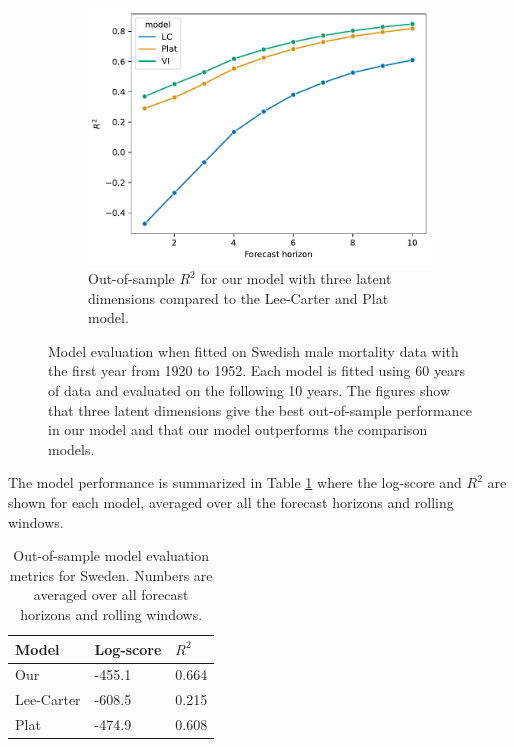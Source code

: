 \documentclass[preprint,12pt]{elsarticle}
\begin{document}
\begin{figure}
\begin{subfigure}[b]{0.45\textwidth}
        \label{fig:model_evaluation_sweden_R2}
    \end{subfigure}
    \hfill
    \begin{subfigure}[b]{0.45\textwidth}
        \centering
        \includegraphics[width=\textwidth]{figs/model_comparison.pdf}
        \caption{Out-of-sample $R^2$ for our model with three latent dimensions compared to the Lee-Carter and Plat model.}
        \label{fig:model_comparison_sweden}
    \end{subfigure}
       \caption{Model evaluation when fitted on Swedish male mortality data with the first year from 1920 to 1952. Each model is fitted using 60 years of data and evaluated on the following 10 years. The figures show that three latent dimensions give the best out-of-sample performance in our model and that our model outperforms the comparison models.}
       \label{fig:model_evaluation_sweden}
\end{figure}
The model performance is summarized in Table \ref{table:model_comparision_sweden} where the log-score and $R^2$ are shown for each model, averaged over all the forecast horizons and rolling windows.
\begin{table}[h!]
    \centering
    \begin{tabular}{l l l} 
        \hline
        Model & Log-score & $R^2$ \\  
        \hline\hline
        Our & -455.1 & 0.664 \\
        Lee-Carter & -608.5 & 0.215 \\ 
        Plat & -474.9 & 0.608 \\
        \hline
    \end{tabular}
    \caption{Out-of-sample model evaluation metrics for Sweden. Numbers are averaged over all forecast horizons and rolling windows.}
    \label{table:model_comparision_sweden}
\end{table}
\end{document}
